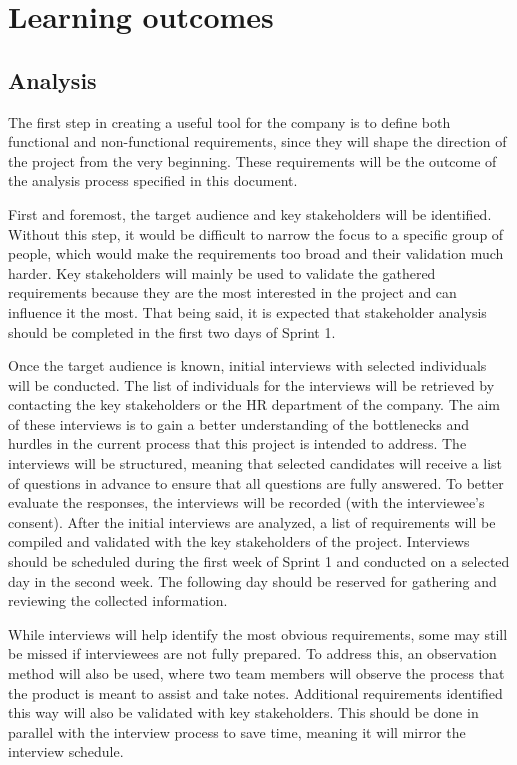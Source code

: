 \section{Learning outcomes}
\label{sec:Learngin-Outcomes}

\subsection{Analysis}
\label{subsec:Analysis}

The first step in creating a useful tool for the company is to define both functional and non-functional requirements, since they will shape the direction of the project from the very beginning. These requirements will be the outcome of the analysis process specified in this document.

First and foremost, the target audience and key stakeholders will be identified. Without this step, it would be difficult to narrow the focus to a specific group of people, which would make the requirements too broad and their validation much harder. Key stakeholders will mainly be used to validate the gathered requirements because they are the most interested in the project and can influence it the most. That being said, it is expected that stakeholder analysis should be completed in the first two days of Sprint 1.

Once the target audience is known, initial interviews with selected individuals will be conducted. The list of individuals for the interviews will be retrieved by contacting the key stakeholders or the HR department of the company. The aim of these interviews is to gain a better understanding of the bottlenecks and hurdles in the current process that this project is intended to address. The interviews will be structured, meaning that selected candidates will receive a list of questions in advance to ensure that all questions are fully answered. To better evaluate the responses, the interviews will be recorded (with the interviewee’s consent). After the initial interviews are analyzed, a list of requirements will be compiled and validated with the key stakeholders of the project. Interviews should be scheduled during the first week of Sprint 1 and conducted on a selected day in the second week. The following day should be reserved for gathering and reviewing the collected information.

While interviews will help identify the most obvious requirements, some may still be missed if interviewees are not fully prepared. To address this, an observation method will also be used, where two team members will observe the process that the product is meant to assist and take notes. Additional requirements identified this way will also be validated with key stakeholders. This should be done in parallel with the interview process to save time, meaning it will mirror the interview schedule.

